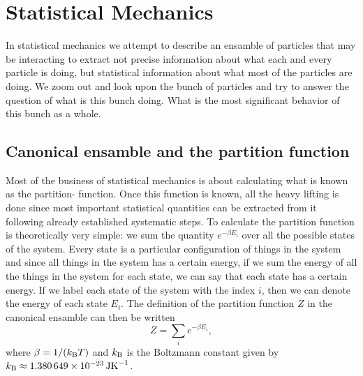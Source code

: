 \chapter{Statistical Mechanics}

In statistical mechanics we attempt to describe an ensamble of particles that may be interacting
to extract not precise information about what each and every particle is doing, but statistical
information about what most of the particles are doing. We zoom out and look upon the bunch of
particles and try to answer the question of what is this bunch doing. What is the most significant
behavior of this bunch as a whole.

\section{Canonical ensamble and the partition function}

Most of the business of statistical mechanics is about calculating what is known as the partition-
function. Once this function is known, all the heavy lifting is done since most important statistical
quantities can be extracted from it following already established systematic steps.
To calculate the partition function is theoretically very simple: we sum the quantity $e^{-\beta E_i}$
over all the possible states of the system. Every state is a particular configuration of things in
the system and since all things in the system has a certain energy, if we sum the energy of all the
things in the system for each state, we can say that each state has a certain energy. If we label
each state of the system with the index $i$, then we can denote the energy of each state $E_i$. The
definition of the partition function $Z$ in the canonical ensamble can then be written
\begin{equation}
    Z = \sum_i e^{-\beta E_i},
    \label{eq:statMech:partDef}
\end{equation}
where $\beta = 1/(\boltz T)$ and $\boltz$ is the Boltzmann constant given by 
$\boltz \approx \SI{1.380649d-23}{JK^{-1}}$.

